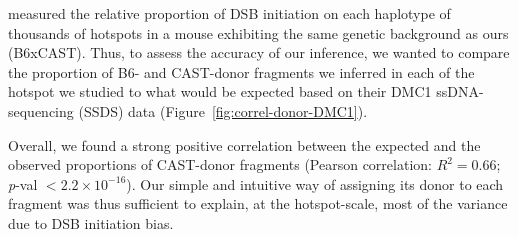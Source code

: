 \citet{smagulova2016evolutionary} measured the relative proportion of DSB initiation on each haplotype of thousands of hotspots in a mouse exhibiting the same genetic background as ours (B6xCAST).
Thus, to assess the accuracy of our inference, we wanted to compare the proportion of B6- and CAST-donor fragments we inferred in each of the hotspot we studied to what would be expected based on their DMC1 ssDNA-sequencing (SSDS) data (Figure~\ref{fig:correl-donor-DMC1}).

Overall, we found a strong positive correlation between the expected and the observed proportions of CAST-donor fragments (Pearson correlation: $R^2 = 0.66$; {\textit{p}-val $< 2.2 \times 10^{-16}$}).
Our simple and intuitive way of assigning its donor to each fragment was thus sufficient to explain, at the hotspot-scale, most of the variance due to DSB initiation bias.



